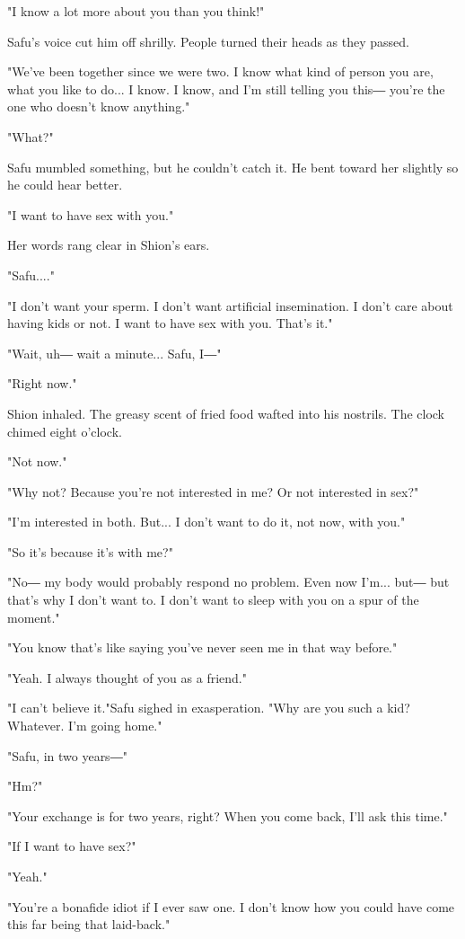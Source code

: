 "I know a lot more about you than you think!"

Safu's voice cut him off shrilly. People turned their heads as they
passed.

"We've been together since we were two. I know what kind of person you
are, what you like to do... I know. I know, and I'm still telling you
this― you're the one who doesn't know anything."

"What?"

Safu mumbled something, but he couldn't catch it. He bent toward her
slightly so he could hear better.

"I want to have sex with you."

Her words rang clear in Shion's ears.~

"Safu...."

"I don't want your sperm. I don't want artificial insemination. I don't
care about having kids or not. I want to have sex with you. That's it."

"Wait, uh― wait a minute... Safu, I―"

"Right now."

Shion inhaled. The greasy scent of fried food wafted into his nostrils.
The clock chimed eight o'clock.

"Not now."

"Why not? Because you're not interested in me? Or not interested in
sex?"

"I'm interested in both. But... I don't want to do it, not now, with
you."

"So it's because it's with me?"

"No― my body would probably respond no problem. Even now I'm... but― but
that's why I don't want to. I don't want to sleep with you on a spur of
the moment."

"You know that's like saying you've never seen me in that way before."

"Yeah. I always thought of you as a friend."

"I can't believe it."Safu sighed in exasperation. "Why are you such a
kid? Whatever. I'm going home."

"Safu, in two years―"

"Hm?"

"Your exchange is for two years, right? When you come back, I'll ask
this time."

"If I want to have sex?"

"Yeah."

"You're a bonafide idiot if I ever saw one. I don't know how you could
have come this far being that laid-back."

